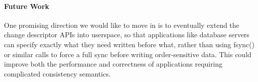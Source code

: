 \preparagraphspacing{}
\paragraph{Future Work}
\label{sec:future}

One promising direction we would like to move in is to eventually extend the
change descriptor APIs into userspace, so that applications like database
servers can specify exactly what they need written before what, rather than
using fsync() or similar calls to force a full sync before writing
order-sensitive data. This could improve both the performance and correctness
of applications requiring complicated consistency semantics.
